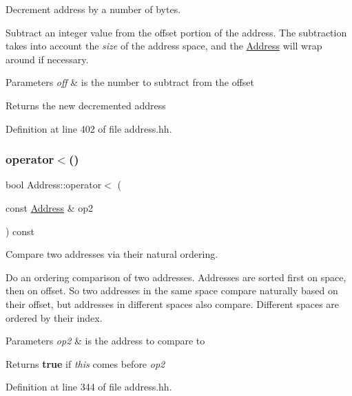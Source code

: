 Decrement address by a number of bytes. 

Subtract an integer value from the offset portion of the address. The subtraction takes into account the {\itshape size} of the address space, and the \mbox{\hyperlink{class_address}{Address}} will wrap around if necessary. 
\begin{DoxyParams}{Parameters}
{\em off} & is the number to subtract from the offset \\
\hline
\end{DoxyParams}
\begin{DoxyReturn}{Returns}
the new decremented address 
\end{DoxyReturn}


Definition at line 402 of file address.\+hh.

\mbox{\label{class_address_ac2109b6d10183b10d67c7f743bfc21dc}} 
\subsubsection{\texorpdfstring{operator$<$()}{operator<()}}
{\footnotesize\ttfamily bool Address\+::operator$<$ (\begin{DoxyParamCaption}\item[{const \mbox{\hyperlink{class_address}{Address}} \&}]{op2 }\end{DoxyParamCaption}) const\hspace{0.3cm}{\ttfamily [inline]}}



Compare two addresses via their natural ordering. 

Do an ordering comparison of two addresses. Addresses are sorted first on space, then on offset. So two addresses in the same space compare naturally based on their offset, but addresses in different spaces also compare. Different spaces are ordered by their index. 
\begin{DoxyParams}{Parameters}
{\em op2} & is the address to compare to \\
\hline
\end{DoxyParams}
\begin{DoxyReturn}{Returns}
{\bfseries{true}} if {\itshape this} comes before {\itshape op2} 
\end{DoxyReturn}


Definition at line 344 of file address.\+hh.

